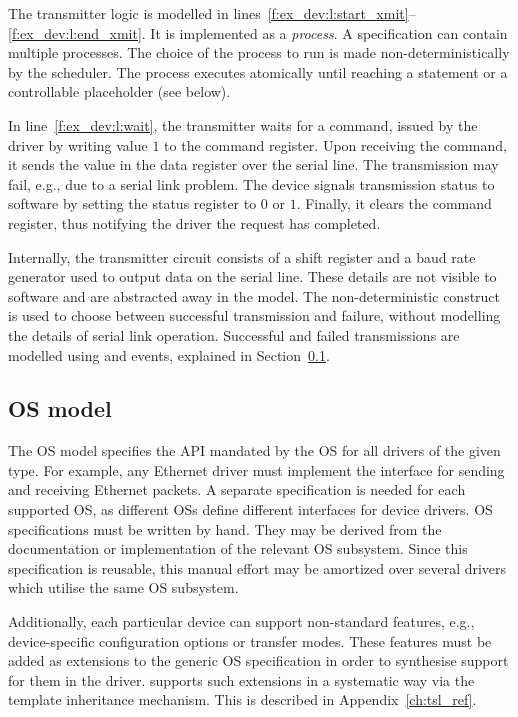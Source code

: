 The transmitter logic is modelled in lines~\ref{f:ex_dev:l:start_xmit}--\ref{f:ex_dev:l:end_xmit}.  It is implemented as a \tsl \emph{process}.  A \tsl specification can contain multiple processes.  The choice of the process to run is made non-deterministically by the scheduler.  The process executes atomically until reaching a  statement or a controllable placeholder (see below).

In line~\ref{f:ex_dev:l:wait}, the transmitter waits for a command, issued by the driver by writing value $1$ to the command register.  Upon receiving the command, it sends the value in the data register over the serial line.  The transmission may fail, e.g., due to a serial link problem.  The device signals transmission status to software by setting the status register to $0$ or $1$.  Finally, it clears the command register, thus notifying the driver the request has completed.

Internally, the transmitter circuit consists of a shift register and a baud rate generator used to output data on the serial line.  These details are not visible to software and are abstracted away in the model.  The non-deterministic  construct is used to choose between successful transmission and failure, without modelling the details of serial link operation.  Successful and failed transmissions are modelled using and  events, explained in Section~\ref{s:os}.

\subsection{OS model}\label{s:os}

The OS model specifies the API mandated by the OS for all drivers of the given type.  For example, any Ethernet driver must implement the interface for sending and receiving Ethernet packets.  A separate specification is needed for each supported OS, as different OSs define different interfaces for device drivers. OS specifications must be written by hand. They may be derived from the documentation or implementation of the relevant OS subsystem. Since this specification is reusable, this manual effort may be amortized over several drivers which utilise the same OS subsystem.

Additionally, each particular device can support non-standard features, e.g., device-specific configuration options or transfer modes.  These features must be added as extensions to the generic OS specification in order to synthesise support for them in the driver.  \tsl supports such extensions in a systematic way via the template inheritance mechanism.  This is described in Appendix~\ref{ch:tsl_ref}.

